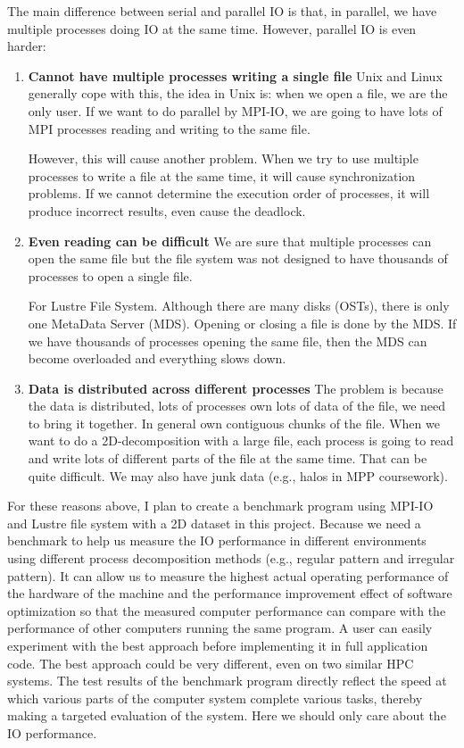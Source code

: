\documentclass{article}
\begin{document}
The main difference between serial and parallel IO is that, in parallel, we
have multiple processes doing IO at the same time. However, parallel IO is even harder:

\begin{enumerate}
	\item \textbf{Cannot have multiple processes writing a single file}
	Unix and Linux generally cope with this, the idea in Unix is: when we open a file, we are the only user. If we want to do parallel by MPI-IO, we are going to have lots of MPI processes reading and writing to the same file.
	
	However, this will cause another problem. When we try to use multiple processes to write a file at the same time, it will cause synchronization problems. If we cannot determine the execution order of processes, it will produce incorrect results, even cause the deadlock.
	\item \textbf{Even reading can be difficult}
	We are sure that multiple processes can open the same file but the file system was not designed to have thousands of processes to open a single file. 
	
	For Lustre File System. Although there are many disks (OSTs), there is only one MetaData Server (MDS). Opening or closing a file is done by the MDS. If we have thousands of processes opening the same file, then the MDS can become overloaded and everything slows down.
	\item \textbf{Data is distributed across different processes}
	The problem is because the data is distributed, lots of processes own lots of data of the file, we need to bring it together. In general own contiguous chunks of the file. When we want to do a 2D-decomposition with a large file, each process is going to read and write lots of different parts of the file at the same time. That can be quite difficult. We may also have junk data (e.g., halos in MPP coursework).
\end{enumerate}

For these reasons above, I plan to create a benchmark program using MPI-IO and Lustre file system with a 2D dataset in this project. Because we need a benchmark to help us measure the IO performance in different environments using different process decomposition methods (e.g., regular pattern and irregular pattern).
It can allow us to measure the highest actual operating performance of the hardware of the machine and the performance improvement effect of software optimization so that the measured computer performance can compare with the performance of other computers running the same program.
A user can easily experiment with the best approach before implementing it in full application code.
The best approach could be very different, even on two similar HPC systems.
The test results of the benchmark program directly reflect the speed at which various parts of the computer system complete various tasks, thereby making a targeted evaluation of the system. Here we should only care about the IO performance.
\end{document}
